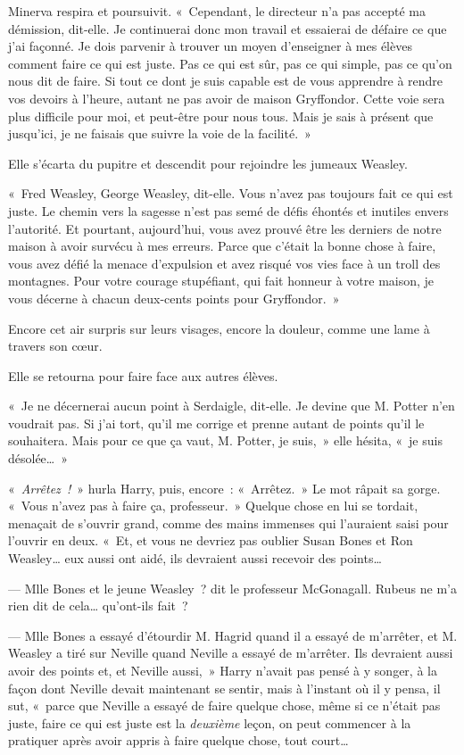 Minerva respira et poursuivit.
«~Cependant, le directeur n'a pas accepté ma démission, dit-elle.
Je continuerai donc mon travail et essaierai de défaire ce que j'ai façonné.
Je dois parvenir à trouver un moyen d'enseigner à mes élèves comment faire ce qui est juste.
Pas ce qui est sûr, pas ce qui simple, pas ce qu'on nous dit de faire.
Si tout ce dont je suis capable est de vous apprendre à rendre vos devoirs à l'heure, autant ne pas avoir de maison Gryffondor.
Cette voie sera plus difficile pour moi, et peut-être pour nous tous.
Mais je sais à présent que jusqu'ici, je ne faisais que suivre la voie de la facilité.~»

Elle s'écarta du pupitre et descendit pour rejoindre les jumeaux Weasley.

«~Fred Weasley, George Weasley, dit-elle.
Vous n'avez pas toujours fait ce qui est juste.
Le chemin vers la sagesse n'est pas semé de défis éhontés et inutiles envers l'autorité.
Et pourtant, aujourd'hui, vous avez prouvé être les derniers de notre maison à avoir survécu à mes erreurs.
Parce que c'était la bonne chose à faire, vous avez défié la menace d'expulsion et avez risqué vos vies face à un troll des montagnes.
Pour votre courage stupéfiant, qui fait honneur à votre maison, je vous décerne à chacun deux-cents points pour Gryffondor.~»

Encore cet air surpris sur leurs visages, encore la douleur, comme une lame à travers son cœur.

Elle se retourna pour faire face aux autres élèves.

«~Je ne décernerai aucun point à Serdaigle, dit-elle.
Je devine que M. Potter n'en voudrait pas.
Si j'ai tort, qu'il me corrige et prenne autant de points qu'il le souhaitera.
Mais pour ce que ça vaut, M. Potter, je suis,~» elle hésita, «~je suis désolée…~»

\later

«~\emph{Arrêtez~!}~» hurla Harry, puis, encore~: «~Arrêtez.~»
Le mot râpait sa gorge.
«~Vous n'avez pas à faire ça, professeur.~»
Quelque chose en lui se tordait, menaçait de s'ouvrir grand, comme des mains immenses qui l'auraient saisi pour l'ouvrir en deux.
«~Et, et vous ne devriez pas oublier Susan Bones et Ron Weasley… eux aussi ont aidé, ils devraient aussi recevoir des points…

--- Mlle Bones et le jeune Weasley~? dit le professeur McGonagall.
Rubeus ne m'a rien dit de cela… qu'ont-ils fait~?

--- Mlle Bones a essayé d'étourdir M. Hagrid quand il a essayé de m'arrêter, et M. Weasley a tiré sur Neville quand Neville a essayé de m'arrêter.
Ils devraient aussi avoir des points et, et Neville aussi,~» Harry n'avait pas pensé à y songer, à la façon dont Neville devait maintenant se sentir, mais à l'instant où il y pensa, il sut, «~parce que Neville a essayé de faire quelque chose, même si ce n'était pas juste, faire ce qui est juste est la \emph{deuxième} leçon, on peut commencer à la pratiquer après avoir appris à faire quelque chose, tout court…

